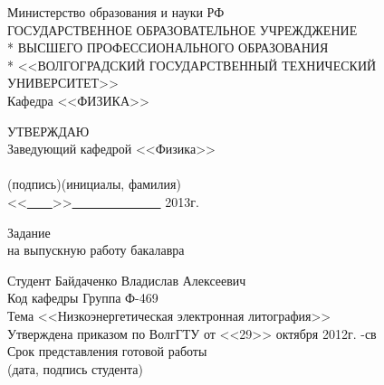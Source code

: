 \begin{titlepage}
\begin{center}
Министерство образования и науки РФ \\
\vspace{.5cm}
ГОСУДАРСТВЕННОЕ ОБРАЗОВАТЕЛЬНОЕ УЧРЕЖДЖЕНИЕ\\*
ВЫСШЕГО ПРОФЕССИОНАЛЬНОГО ОБРАЗОВАНИЯ\\*
<<ВОЛГОГРАДСКИЙ ГОСУДАРСТВЕННЫЙ ТЕХНИЧЕСКИЙ УНИВЕРСИТЕТ>>\\
\vspace{.5cm}
Кафедра <<ФИЗИКА>>
\vspace{.5cm}
\end{center}
\begin{flushright}
УТВЕРЖДАЮ\\
Заведующий кафедрой <<Физика>>\\
\vspace{.3cm}
\underline{\hspace{2cm}}\hspace{1cm}\underline{\hspace{4cm}}\\
\vspace{-.2cm}\footnotesize(подпись)\hspace{1.8cm}(инициалы, фамилия)\hspace*{.2cm}\ \normalsize\\
\vspace{.3cm}
<<\underline{\ \ \ \ }>>\underline{\ \ \ \ \ \ \ \ \ \ \ \ \ \ } 2013г.
\end{flushright}
\begin{center}
\large Задание \\
\normalsize на выпускную работу бакалавра
\end{center}
\begin{flushleft}
Студент Байдаченко Владислав Алексеевич\\
Код кафедры \underline{\hspace{3cm}}\hspace{6cm}Группа Ф-469\\
Тема <<Низкоэнергетическая электронная литография>>\\
Утверждена приказом по ВолгГТУ от <<29>> октября 2012г. -св\\
Срок представления готовой работы \underline{\hspace{6cm}}\\
\vspace{-.2cm}\hspace{9.5cm}\footnotesize(дата, подпись студента)\normalsize\\

\end{flushleft}
\end{titlepage}
